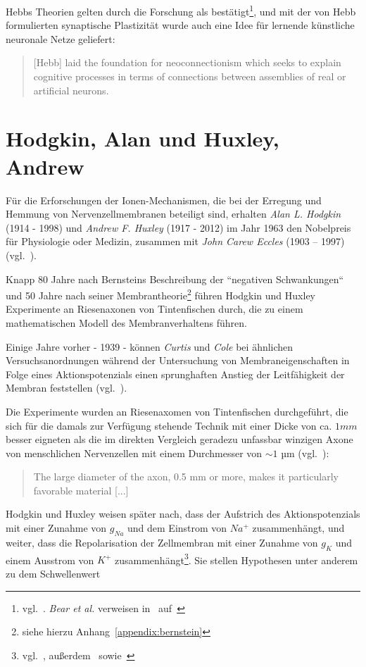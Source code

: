 Hebbs Theorien gelten durch die Forschung als bestätigt\footnote{
vgl.~\cite[833]{Flo19}. \textit{Bear et al.} verweisen in~\cite[875, Exkurs 23.5]{BCP18} auf~\cite{CL78}
}, und mit der von Hebb formulierten synaptische Plastizität wurde auch eine Idee für lernende künstliche neuronale Netze geliefert:

\blockquote[{\cite[2]{Kle99}}]{
    [Hebb] laid the foundation for neoconnectionism which seeks to explain cognitive processes in terms of connections between assemblies of real or artificial neurons.
}



\section{Hodgkin, Alan und Huxley, Andrew}\label{appendix:hodgkinhuxley}

Für die Erforschungen der Ionen-Mechanismen, die bei der Erregung und Hemmung von Nervenzellmembranen beteiligt sind, erhalten \textit{Alan L. Hodgkin} (1914 - 1998) und \textit{Andrew F. Huxley} (1917 - 2012) im Jahr 1963 den Nobelpreis für Physiologie oder Medizin, zusammen mit \textit{John Carew Eccles} (1903 – 1997) (vgl.~\cite{Gle09}).

Knapp 80 Jahre nach Bernsteins Beschreibung der ``negativen Schwankungen`` und 50 Jahre nach seiner Membrantheorie\footnote{
siehe hierzu Anhang~\ref{appendix:bernstein}
} führen Hodgkin und Huxley Experimente an Riesenaxonen von Tintenfischen durch, die zu einem mathematischen Modell des Membranverhaltens führen.

Einige Jahre vorher - 1939 - können \textit{Curtis} und \textit{Cole} bei ähnlichen Versuchsanordnungen während der Untersuchung von Membraneigenschaften in Folge eines Aktionspotenzials einen sprunghaften Anstieg der Leitfähigkeit der Membran feststellen (vgl.~\cite[669]{CC39}).

Die Experimente wurden an Riesenaxomen von Tintenfischen durchgeführt, die sich für die damals zur Verfügung stehende Technik mit einer Dicke von ca. $1 mm$ besser eigneten als die im direkten Vergleich geradezu unfassbar winzigen Axone von menschlichen Nervenzellen mit einem Durchmesser von $\sim1$ µm (vgl.~\cite[79]{Jon19}):

\blockquote[{\cite[650]{CC39}}]{
    The large diameter of the axon, 0.5 mm or more, makes it particularly favorable material {[...]}
}

Hodgkin und Huxley weisen später nach, dass der Aufstrich des Aktionspotenzials mit einer Zunahme von $g_{Na}$ und dem Einstrom von $Na^+$ zusammenhängt, und weiter, dass die Repolarisation der Zellmembran mit einer Zunahme von $g_K$ und einem Ausstrom von $K^+$ zusammenhängt\footnote{
    vgl.~\cite[75]{Jon19}, außerdem~\cite[96]{BCP18} sowie~\cite[530 Fig. 17]{HH52}
}.
Sie stellen Hypothesen unter anderem zu dem Schwellenwert

